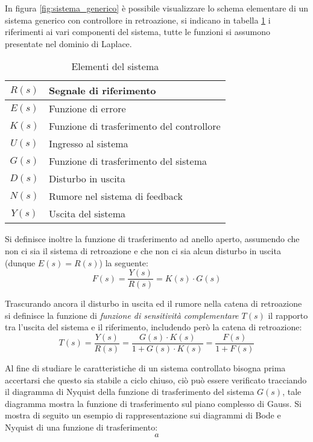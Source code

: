 In figura \ref{fig:sistema_generico} è possibile visualizzare lo schema elementare di un sistema generico con controllore in retroazione, si indicano in tabella \ref{tab:elementi_sistema} i riferimenti ai vari componenti del sistema, tutte le funzioni si assumono presentate nel dominio di Laplace.
\begin{table}[h]\centering
    \begin{tabular}{c | l}
        $R(s)$ & Segnale di riferimento                    \\ \hline
        $E(s)$ & Funzione di errore                        \\ \hline
        $K(s)$ & Funzione di trasferimento del controllore \\ \hline
        $U(s)$ & Ingresso al sistema                       \\ \hline
        $G(s)$ & Funzione di trasferimento del sistema     \\ \hline
        $D(s)$ & Disturbo in uscita                        \\ \hline
        $N(s)$ & Rumore nel sistema di feedback            \\ \hline
        $Y(s)$ & Uscita del sistema
    \end{tabular}
    \caption{Elementi del sistema}
    \label{tab:elementi_sistema}
\end{table}

Si definisce inoltre la funzione di trasferimento ad anello aperto, assumendo che non ci sia il sistema di retroazione e che non ci sia alcun disturbo in uscita (dunque $E(s) = R(s)$) la seguente:
$$
    F(s) = \frac{Y(s)}{R(s)} = K(s)\cdot G(s)
$$

Trascurando ancora il disturbo in uscita ed il rumore nella catena di retroazione si definisce la funzione di \textit{funzione di sensitività complementare $T(s)$} il rapporto tra l'uscita del sistema e il riferimento, includendo però la catena di retroazione:
$$
    T(s) = \frac{Y(s)}{R(s)} = \frac{G(s)\cdot K(s)}{1 + G(s)\cdot K(s)} =\frac{F(s)}{1+F(s)}
$$

Al fine di studiare le caratteristiche di un sistema controllato bisogna prima accertarsi che questo sia stabile a ciclo chiuso, ciò può essere verificato tracciando il diagramma di Nyquist della funzione di trasferimento del sistema $G(s)$, tale diagramma mostra la funzione di trasferimento sul piano complesso di Gauss.
Si mostra di seguito un esempio di rappresentazione sui diagrammi di Bode e Nyquist di una funzione di trasferimento:
$$
    a
$$

